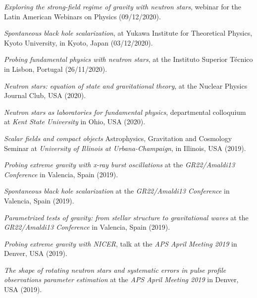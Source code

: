 \documentclass[10pt]{article}
\newcommand{\invited}{{\color{aeilbl}{invited}}}
\begin{document}
\begin{bibenum}
    \item
    \emph{Exploring the strong-field regime of gravity with neutron stars},
    \invited{} webinar for the Latin American Webinars on Physics (09/12/2020).

    \item
    \emph{Spontaneous black hole scalarization},
    \invited{} at Yukawa Institute for Theoretical Physics, Kyoto University,
    in Kyoto, Japan (03/12/2020).

    \item
    \emph{Probing fundamental physics with neutron stars},
    \invited{} at the Instituto Superior T\'ecnico
    in Lisbon, Portugal (26/11/2020).

    \item
    \emph{Neutron stars: equation of state and gravitational theory},
    \invited{} at the Nuclear Physics Journal Club, USA (2020).

    \item
    \emph{Neutron stars as laboratories for fundamental physics},
    \invited{} departmental colloquium at \emph{Kent State University}
    in Ohio, USA (2020).

    \item
    \emph{Scalar fields and compact objects}
    Astrophysics, Gravitation and Cosmology Seminar at \emph{University of Illinois at Urbana-Champaign},
    in Illinois, USA (2019).

    \item
    \emph{Probing extreme gravity with x-ray burst oscillations}
    at the \emph{GR22/Amaldi13 Conference}
    in Valencia, Spain (2019).

    \item
    \emph{Spontaneous black hole scalarization}
    at the \emph{GR22/Amaldi13 Conference}
    in Valencia, Spain (2019).

    \item
    \emph{Parametrized tests of gravity: from stellar structure to gravitational waves}
    at the \emph{GR22/Amaldi13 Conference}
    in Valencia, Spain (2019).

    \item
    \emph{Probing extreme gravity with NICER},
    \invited{} talk at the \emph{APS April Meeting 2019}
    in Denver, USA (2019).

    \item
    \emph{The shape of rotating neutron stars and systematic errors
          in pulse profile observations parameter estimation}
    at the \emph{APS April Meeting 2019}
    in Denver, USA (2019).


\end{bibenum}
\end{document}
